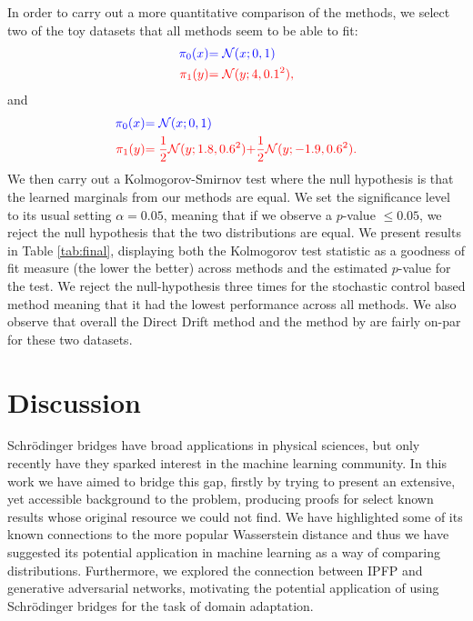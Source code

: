 \documentclass[a4paper,12pt,twoside,openright]{report}
\theoremstyle{definition}
\begin{document}
In order to carry out a more quantitative comparison of the methods, we select two of the toy datasets that all methods seem to be able to fit:
\begin{align*}
\color{blue}{\pi_0(x)} &\color{blue}{= {\mathcal{N}}(x; 0,  1)} \\
    \color{red}{\pi_1(y)} &\color{red}{= {\mathcal{N}}(y; 4, 0.1^2)} ,
\end{align*}
and
\begin{align*}
     \color{blue}{\pi_0(x)} &\color{blue}{= {\mathcal{N}}(x; 0,  1)} \\
    \color{red}{\pi_1(y)} &\color{red}{= \frac{1}{2}{\mathcal{N}}(y; 1.8, 0.6 ^2)}\color{red}{ + \frac{1}{2}{\mathcal{N}}(y; -1.9, 0.6 ^2) }.
\end{align*}
We then carry out a Kolmogorov-Smirnov \citep{kolmogorov1933sulla} test where the null hypothesis is that the learned marginals from our methods are equal. We set the significance level to its usual setting  $\alpha=0.05$, meaning that if we observe a $p$-value $\leq 0.05$, we reject the null hypothesis that the two distributions are equal. We present results in Table \ref{tab:final}, displaying both the Kolmogorov test statistic as a goodness of fit measure (the lower the better) across methods and the estimated $p$-value for the test. We reject the null-hypothesis three times for the stochastic control based method meaning that it had the lowest performance across all methods. We also observe that overall the Direct Drift method and the method by \cite{pavon2018data} are fairly on-par for these two datasets.
\chapter{Discussion}
Schrödinger bridges have broad applications in physical sciences, but only recently have they sparked interest in the machine learning community.
In this work we have aimed to bridge this gap, firstly by trying to present an extensive, yet accessible background to the problem, producing proofs for select known results whose original resource we could not find. We have highlighted some of its known connections to the more popular Wasserstein distance and thus we have suggested its potential application in machine learning as a way of comparing distributions. Furthermore, we explored the connection between IPFP and generative adversarial networks, motivating the potential application of using Schrödinger bridges for the task of domain adaptation.
\end{document}
